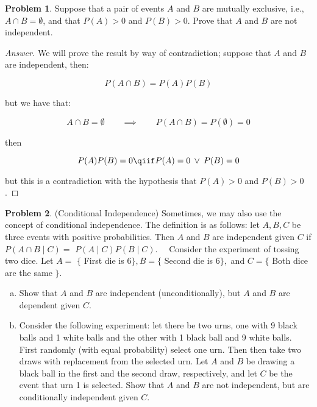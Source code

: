 \documentclass{article}
\theoremstyle{definition}
\newtheorem{problem}{Problem}
\newcommand{\qiq}{\qquad \implies \qquad}
\begin{document}
\begin{problem}
Suppose that a pair of events $A$ and $B$ are mutually exclusive, i.e., $A \cap B=\emptyset$,
and that $P(A)>0$ and $P(B)>0 .$ Prove that $A$ and $B$ are not independent.
\end{problem}

\begin{proof}[Answer]
We will prove the result by way of contradiction; suppose that $A$ and $B$ are independent, then:

$$P(A\cap B) = P(A)P(B)$$

but we have that:

$$A\cap B=\emptyset \qiq P(A\cap B)=P(\emptyset)=0$$

then

$$P(A)P(B)=0 \qiif P(A)=0 \: \lor \: P(B)=0$$

but this is a contradiction with the hypothesis that $P(A)>0$ and $P(B)>0$.

\end{proof}

\begin{problem}
(Conditional Independence) Sometimes, we may also use the concept of conditional
independence. The definition is as follows: let $A, B, C$ be three events with positive probabilities. Then $A$ and $B$ are independent given $C$ if $P(A \cap B \mid C)=$
$P(A \mid C) P(B \mid C) . \quad$ Consider the experiment of tossing two dice. Let $A=$
$\{$ First die is 6$\}, B=\{$ Second die is 6$\},$ and $C=\{$ Both dice are the same $\} .$
\begin{enumerate}[(a)]
    \item  Show that $A$ and $B$ are independent (unconditionally), but $A$ and $B$ are dependent given $C$.
    \item Consider the following experiment: let there be two urns, one with 9
black balls and 1 white balls and the other with 1 black ball and 9 white
balls. First randomly (with equal probability) select one urn. Then then
take two draws with replacement from the selected urn. Let $A$ and $B$ be
drawing a black ball in the first and the second draw, respectively, and
let $C$ be the event that urn 1 is selected. Show that $A$ and $B$ are not
independent, but are conditionally independent given $C$.
\end{enumerate}

\end{problem}
\end{document}
